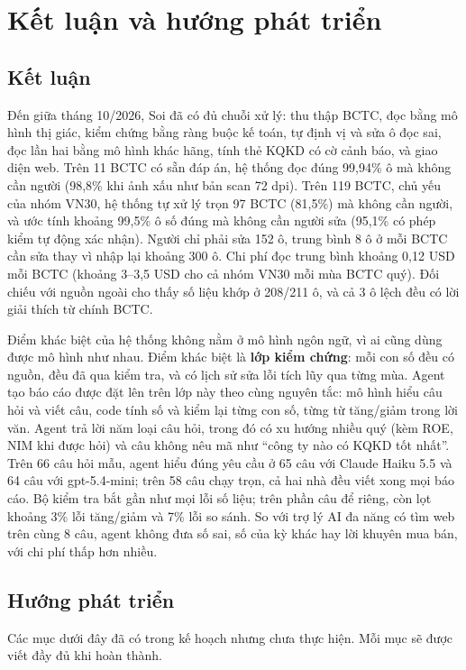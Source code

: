 \documentclass[12pt,a4paper]{report}
\newcommand{\enquote}[1]{“#1”}
\begin{document}
\chapter{Kết luận và hướng phát triển}\label{chap:ketluan}

\section{Kết luận}
Đến giữa tháng 10/2026, Soi đã có đủ chuỗi xử lý: thu thập BCTC, đọc bằng mô hình thị giác, kiểm chứng bằng ràng buộc kế
toán, tự định vị và sửa ô đọc sai, đọc lần hai bằng mô hình khác hãng, tính thẻ KQKD có cờ cảnh báo, và giao diện web.
Trên 11 BCTC có sẵn đáp án, hệ thống đọc đúng 99,94\% ô mà không cần người (98,8\% khi ảnh xấu như bản scan 72 dpi).
Trên 119 BCTC, chủ yếu của nhóm VN30, hệ thống tự xử lý trọn 97 BCTC (81,5\%) mà không cần người, và ước tính khoảng 99,5\% ô số đúng
mà không cần người sửa (95,1\% có phép kiểm tự động xác nhận). Người chỉ phải sửa 152 ô, trung bình 8 ô ở mỗi BCTC cần
sửa thay vì nhập lại khoảng 300 ô. Chi phí đọc trung bình khoảng 0,12 USD mỗi BCTC (khoảng 3--3,5 USD cho
cả nhóm VN30 mỗi mùa BCTC quý). Đối chiếu với nguồn ngoài cho thấy số liệu khớp ở 208/211 ô, và cả 3 ô
lệch đều có lời giải thích từ chính BCTC.

Điểm khác biệt của hệ thống không nằm ở mô hình ngôn ngữ, vì ai cũng dùng được mô hình như nhau. Điểm khác biệt là
\textbf{lớp kiểm chứng}: mỗi con số đều có nguồn, đều đã qua kiểm tra, và có lịch sử sửa lỗi tích lũy qua từng mùa.
Agent tạo báo cáo được đặt lên trên lớp này theo cùng nguyên tắc: mô hình hiểu câu hỏi và viết câu, code tính số và kiểm
lại từng con số, từng từ tăng/giảm trong lời văn. Agent trả lời năm loại câu hỏi, trong đó có xu hướng nhiều quý (kèm ROE, NIM khi được hỏi) và câu không nêu mã như
\enquote{công ty nào có KQKD tốt nhất}. Trên 66 câu hỏi mẫu, agent hiểu đúng yêu cầu ở 65 câu với Claude Haiku 5.5 và 64
câu với gpt-5.4-mini; trên 58 câu chạy trọn, cả hai nhà đều viết xong mọi báo cáo. Bộ kiểm tra bắt gần như mọi lỗi số
liệu; trên phần câu để riêng, còn lọt khoảng 3\% lỗi tăng/giảm và 7\% lỗi so sánh. So với trợ lý
AI đa năng có tìm web trên cùng 8 câu, agent không đưa số sai, số của kỳ khác hay lời khuyên mua bán, với chi phí thấp hơn
nhiều.

\section{Hướng phát triển}
Các mục dưới đây đã có trong kế hoạch nhưng chưa thực hiện. Mỗi mục sẽ được viết đầy đủ khi hoàn thành.
\end{document}
